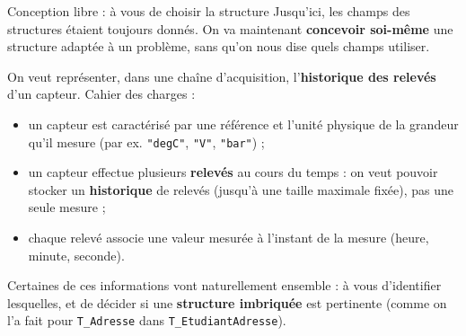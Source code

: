 \begin{UPSTIexercice}{Conception libre : à vous de choisir la structure}
    Jusqu'ici, les champs des structures étaient toujours donnés. On va maintenant
    \textbf{concevoir soi-même} une structure adaptée à un problème, sans qu'on nous dise quels
    champs utiliser.


    On veut représenter, dans une chaîne d'acquisition, l'\textbf{historique des relevés} d'un
    capteur. Cahier des charges :
    \begin{itemize}
        \item un capteur est caractérisé par une référence et l'unité physique de la grandeur
            qu'il mesure (par ex. \texttt{"degC"}, \texttt{"V"}, \texttt{"bar"}) ;
        \item un capteur effectue plusieurs \textbf{relevés} au cours du temps : on veut pouvoir
            stocker un \textbf{historique} de relevés (jusqu'à une taille maximale fixée), pas
            une seule mesure ;
        \item chaque relevé associe une valeur mesurée à l'instant de la mesure (heure, minute,
            seconde).
    \end{itemize}

    Certaines de ces informations vont naturellement ensemble : à vous d'identifier lesquelles, et
    de décider si une \textbf{structure imbriquée} est pertinente (comme on l'a fait pour
    \texttt{T\_Adresse} dans \texttt{T\_EtudiantAdresse}).


\begin{UPSTIeleveOnlyEnv}
\end{UPSTIeleveOnlyEnv}


\end{UPSTIexercice}
